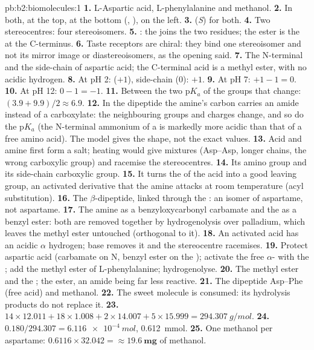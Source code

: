 \begin{solution}{pb:b2:biomolecules:1}
\textbf{1.} L-Aspartic acid, L-phenylalanine and methanol.
\textbf{2.} In both,  at the top,  at the bottom (, ), 
on the left.
\textbf{3.} (\textit{S}) for both.
\textbf{4.} Two stereocentres: four stereoisomers.
\textbf{5.} : the  joins the two
residues; the ester is the  at the C-terminus.
\textbf{6.} Taste receptors are chiral: they bind one stereoisomer and not its mirror image or
diastereoisomers, as the opening said.
\textbf{7.} The N-terminal  and the side-chain  of aspartic acid; the C-terminal acid
is a methyl ester, with no acidic hydrogen.
\textbf{8.} At pH 2:  ($+1$), side-chain  (0): $+1$.
\textbf{9.} At pH 7: $+1 - 1 = 0$.
\textbf{10.} At pH 12: $0 - 1 = -1$.
\textbf{11.} Between the two $\mathrm pK_a$ of the groups that change: $(3.9 + 9.9)/2 \approx 6.9$.
\textbf{12.} In the dipeptide the amine's carbon carries an amide instead of a carboxylate: the
neighbouring groups and charges change, and so do the $\mathrm pK_a$ (the N-terminal ammonium of a
 is markedly more acidic than that of a free amino acid). The model gives the shape, not the
exact values.
\textbf{13.} Acid and amine first form a salt; heating would give mixtures (Asp--Asp, longer chains,
the wrong carboxylic group) and racemise the stereocentres.
\textbf{14.} Its amino group and its side-chain carboxylic group.
\textbf{15.} It turns the  of the acid into a good leaving group, an activated derivative that the
amine attacks at room temperature (acyl substitution).
\textbf{16.} The $\beta$-dipeptide, linked through the : an isomer of aspartame, not aspartame.
\textbf{17.} The amine as a benzyloxycarbonyl carbamate and the  as a benzyl ester: both are
removed together by hydrogenolysis over palladium, which leaves the methyl ester untouched (orthogonal
to it).
\textbf{18.} An activated acid has an acidic $\alpha$ hydrogen; base removes it and the stereocentre
racemises.
\textbf{19.} Protect aspartic acid (carbamate on N, benzyl ester on the ); activate the free
$\alpha$- with the ; add the methyl ester of L-phenylalanine; hydrogenolyse.
\textbf{20.} The methyl ester and the ; the ester, an amide being far less reactive.
\textbf{21.} The dipeptide Asp--Phe (free acid) and methanol.
\textbf{22.} The sweet molecule is consumed: its hydrolysis products do not replace it.
\textbf{23.} $14 \times 12.011 + 18 \times 1.008 + 2 \times 14.007 + 5 \times 15.999 =
\qty{294.307}{g/mol}$.
\textbf{24.} $0.180/294.307 = \qty{6.116e-4}{mol}$, \qty{0.612}{mmol}.
\textbf{25.} One methanol per aspartame: $0.6116 \times 32.042 = \boldsymbol{\approx \qty{19.6}{mg}}$ of
methanol.
\end{solution}
